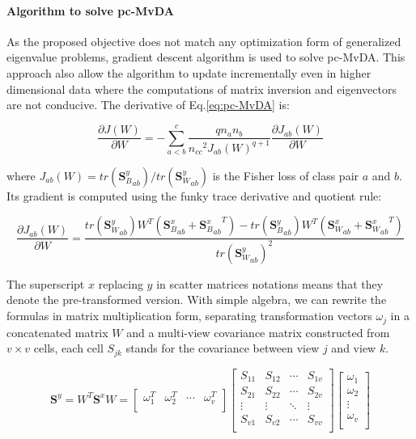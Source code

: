     \paragraph{Algorithm to solve pc-MvDA}
        As the proposed objective does not match any optimization form of generalized eigenvalue problems, gradient descent algorithm is used to solve pc-MvDA. This approach also allow the algorithm to update incrementally even in higher dimensional data where the computations of matrix inversion and eigenvectors are not conducive. The derivative of Eq.\eqref{eq:pc-MvDA} is:

        \begin{equation}
            \frac{\partial J\left(W\right)}{\partial W}=-\sum_{a<b}^{c}{\frac{qn_an_b}{{n_{cc}}^2{J_{ab}\left(W\right)}^{q+1}}\frac{\partial J_{ab}\left(W\right)}{\partial W}}
        \end{equation}

        where $J_{ab}\left(W\right)={tr\left({\boldsymbol{S}_B^y}_{ab}\right)}/{tr\left({\boldsymbol{S}_W^y}_{ab}\right)}$ is the Fisher loss of class pair $a$ and $b$. Its gradient is computed using the funky trace derivative and quotient rule:

        \begin{equation}
            \frac{\partial J_{ab}\left(W\right)}{\partial W}=\frac{tr\left({\boldsymbol{S}_W^y}_{ab}\right)W^T\left({\boldsymbol{S}_B^x}_{ab}+{{\boldsymbol{S}_B^x}_{ab}}^T\right)-tr\left({\boldsymbol{S}_B^y}_{ab}\right)W^T\left({\boldsymbol{S}_W^x}_{ab}+{{\boldsymbol{S}_W^x}_{ab}}^T\right)}{{tr\left({\boldsymbol{S}_W^y}_{ab}\right)}^2}
            \label{eq:grad_Jab}
        \end{equation}

        The superscript $x$ replacing $y$ in scatter matrices notations means that they denote the pre-transformed version. With simple algebra, we can rewrite the formulas in matrix multiplication form, separating transformation vectors $\omega_j$ in a concatenated matrix $W$ and a multi-view covariance matrix constructed from $v\times v$ cells, each cell $S_{jk}$ stands for the covariance between view $j$ and view $k$.

        \begin{equation}
            \boldsymbol{S}^y=W^T\boldsymbol{S}^xW=\left[\begin{matrix}\omega_1^T&\omega_2^T&\cdots&\omega_v^T\\\end{matrix}\right]\left[\begin{matrix}S_{11}&S_{12}&\cdots&S_{1v}\\S_{21}&S_{22}&\cdots&S_{2v}\\\vdots&\vdots&\ddots&\vdots\\S_{v1}&S_{v2}&\cdots&S_{vv}\\\end{matrix}\right]\left[\begin{matrix}\omega_1\\\omega_2\\\vdots\\\omega_v\\\end{matrix}\right]
        \end{equation}

